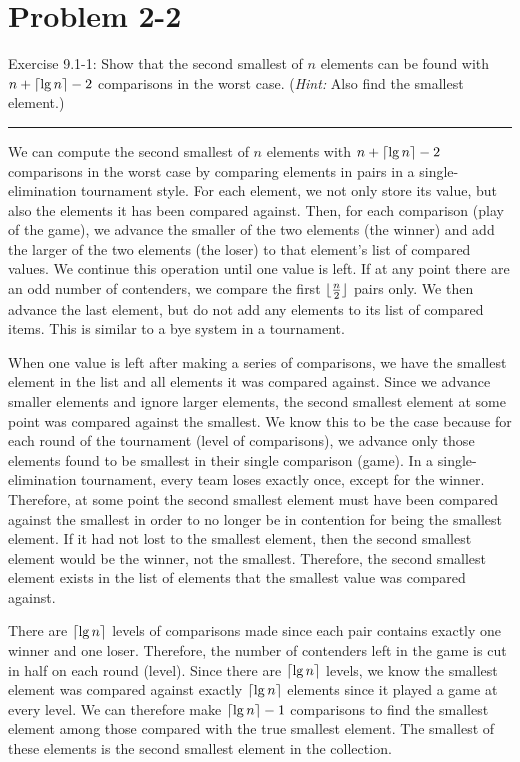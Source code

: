 \documentclass[11pt]{article}
\def\separateline{\medskip\hrule\medskip}
\DeclarePairedDelimiter{\ceil}{\lceil}{\rceil}
\DeclarePairedDelimiter\floor{\lfloor}{\rfloor}
\begin{document}
\newpage

\section{Problem 2-2}
Exercise 9.1-1: Show that the second smallest of $n$ elements can be found with $n + \ceil{\lg{n}} - 2$ comparisons in the worst case. (\textit{Hint:} Also find the smallest element.)
\separateline

We can compute the second smallest of $n$ elements with $n + \ceil{\lg{n}} - 2$ comparisons in the worst case by comparing elements in pairs in a single-elimination tournament style. For each element, we not only store its value, but also the elements it has been compared against. Then, for each comparison (play of the game), we advance the smaller of the two elements (the winner) and add the larger of the two elements (the loser) to that element's list of compared values. We continue this operation until one value is left. If at any point there are an odd number of contenders, we compare the first $\floor{\frac{n}{2}}$ pairs only. We then advance the last element, but do not add any elements to its list of compared items. This is similar to a bye system in a tournament.

When one value is left after making a series of comparisons, we have the smallest element in the list and all elements it was compared against. Since we advance smaller elements and ignore larger elements, the second smallest element at some point was compared against the smallest. We know this to be the case because for each round of the tournament (level of comparisons), we advance only those elements found to be smallest in their single comparison (game). In a single-elimination tournament, every team loses exactly once, except for the winner. Therefore, at some point the second smallest element must have been compared against the smallest in order to no longer be in contention for being the smallest element. If it had not lost to the smallest element, then the second smallest element would be the winner, not the smallest. Therefore, the second smallest element exists in the list of elements that the smallest value was compared against.

There are $\ceil{\lg{n}}$ levels of comparisons made since each pair contains exactly one winner and one loser. Therefore, the number of contenders left in the game is cut in half on each round (level). Since there are $\ceil{\lg{n}}$ levels, we know the smallest element was compared against exactly $\ceil{\lg{n}}$ elements since it played a game at every level. We can therefore make $\ceil{\lg{n}} - 1$ comparisons to find the smallest element among those compared with the true smallest element. The smallest of these elements is the second smallest element in the collection.
\end{document}
